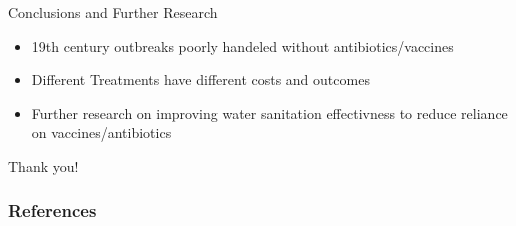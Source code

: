 \documentclass{beamer}\usepackage[]{graphicx}\usepackage[]{color}
\begin{document}
\begin{frame}{Conclusions and Further Research}
\begin{itemize}
\setlength\itemsep{2em}
\item 19th century outbreaks poorly handeled without antibiotics/vaccines
\item Different Treatments have different costs and outcomes
\item Further research on improving water sanitation effectivness to reduce reliance on vaccines/antibiotics
\end{itemize}
\end{frame}


\begin{frame}
\begin{center}
{\huge Thank you!}
\end{center}
\end{frame}


\begin{frame}[allowframebreaks]
        \frametitle{References}
        
        
        \nocite{*}
\end{frame}
\end{document}
